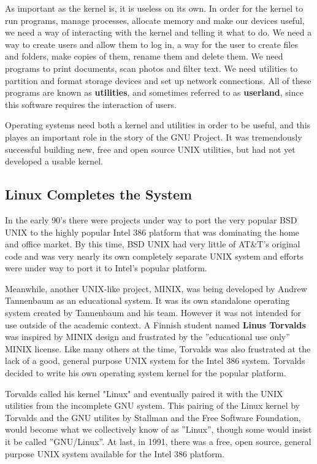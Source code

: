 As important as the kernel is, it is useless on its own. In order for the kernel to run programs, manage processes, allocate memory and make our devices useful, we need a way of interacting with the kernel and telling it what to do. We need a way to create users and allow them to log in, a way for the user to create files and folders, make copies of them, rename them and delete them. We need programs to print documents, scan photos and filter text.  We need utilities to partition and format storage devices and set up network connections.  All of these programs are known as \textbf{utilities}, and sometimes referred to as \textbf{userland}, since this software requires the interaction of users.

Operating systems need both a kernel and utilities in order to be useful, and this playes an important role in the story of the GNU Project. It was tremendously successful building new, free and open source UNIX utilities, but had not yet developed a usable kernel.

\subsection{Linux Completes the System}

In the early 90's there were projects under way to port the very popular BSD UNIX to the highly popular Intel 386 platform that was dominating the home and office market.  By this time, BSD UNIX had very little of AT\&T's original code and was very nearly its own completely separate UNIX system and efforts were under way to port it to Intel's popular platform.

Meanwhile, another UNIX-like project, MINIX, was being developed by Andrew Tannenbaum as an educational system. It was its own standalone operating system created by Tannenbaum and his team.  However it was not intended for use outside of the academic context.  A Finnish student named \textbf{Linus Torvalds} was inspired by MINIX design and frustrated by the ''educational use only'' MINIX license. Like many others at the time, Torvalds was also frustrated at the lack of a good, general purpose UNIX system for the Intel 386 system.  Torvalds decided to write his own operating system kernel for the popular platform.

Torvalds called his kernel "Linux" and eventually paired it with the UNIX utilities from the incomplete GNU system.  This pairing of the Linux kernel by Torvalds and the GNU utilites by Stallman and the Free Software Foundation, would become what we collectively know of as ''Linux'', though some would insist it be called ''GNU/Linux''.  At last, in 1991, there was a free, open source, general purpose UNIX system available for the Intel 386 platform. 

